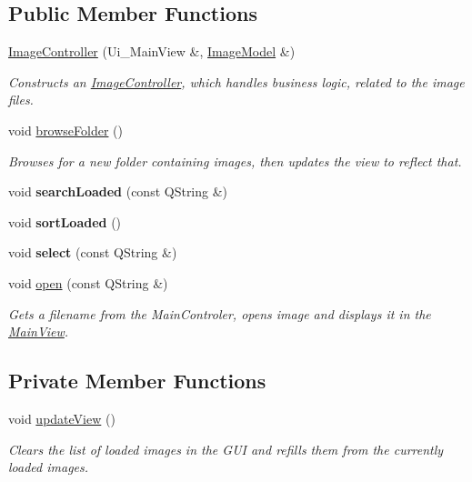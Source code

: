\subsection*{Public Member Functions}
\begin{DoxyCompactItemize}
\item 
\hyperlink{classImageController_a317e49c29f50578a1001b73749151e3a}{Image\+Controller} (Ui\+\_\+\+Main\+View \&, \hyperlink{classImageModel}{Image\+Model} \&)
\begin{DoxyCompactList}\small\item\em Constructs an \hyperlink{classImageController}{Image\+Controller}, which handles business logic, related to the image files. \end{DoxyCompactList}\item 
\mbox{\label{classImageController_a203590172b061a2e20d09dc9f8f060b7}} 
void \hyperlink{classImageController_a203590172b061a2e20d09dc9f8f060b7}{browse\+Folder} ()
\begin{DoxyCompactList}\small\item\em Browses for a new folder containing images, then updates the view to reflect that. \end{DoxyCompactList}\item 
\mbox{\label{classImageController_a29879b8ce218c266f100ef6da70687ca}} 
void {\bfseries search\+Loaded} (const Q\+String \&)
\item 
\mbox{\label{classImageController_aa27c122f5fa43ed32984077cc0f1871a}} 
void {\bfseries sort\+Loaded} ()
\item 
\mbox{\label{classImageController_a81d44568235778fe6d5dc14fb377499a}} 
void {\bfseries select} (const Q\+String \&)
\item 
void \hyperlink{classImageController_a3f5976d87977aa1cda7b5a9a7ad0f03b}{open} (const Q\+String \&)
\begin{DoxyCompactList}\small\item\em Gets a filename from the Main\+Controler, opens image and displays it in the \hyperlink{classMainView}{Main\+View}. \end{DoxyCompactList}\end{DoxyCompactItemize}
\subsection*{Private Member Functions}
\begin{DoxyCompactItemize}
\item 
\mbox{\label{classImageController_a3a300727ff5e30b19fcc0102427fdb30}} 
void \hyperlink{classImageController_a3a300727ff5e30b19fcc0102427fdb30}{update\+View} ()
\begin{DoxyCompactList}\small\item\em Clears the list of loaded images in the G\+UI and refills them from the currently loaded images. \end{DoxyCompactList}\end{DoxyCompactItemize}
